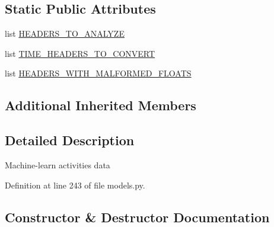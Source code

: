 \subsection*{Static Public Attributes}
\begin{DoxyCompactItemize}
\item 
list \hyperlink{classpygce_1_1analysis_1_1models_1_1_activities_data_analysis_a799ad90125cc686b985fe525a3b33062}{H\+E\+A\+D\+E\+R\+S\+\_\+\+T\+O\+\_\+\+A\+N\+A\+L\+Y\+ZE}
\item 
list \hyperlink{classpygce_1_1analysis_1_1models_1_1_activities_data_analysis_a2f0ccc7899b8c6b6d94391c80f5def1d}{T\+I\+M\+E\+\_\+\+H\+E\+A\+D\+E\+R\+S\+\_\+\+T\+O\+\_\+\+C\+O\+N\+V\+E\+RT}
\item 
list \hyperlink{classpygce_1_1analysis_1_1models_1_1_activities_data_analysis_a272e010f956a64a8f916ebf1b9e14255}{H\+E\+A\+D\+E\+R\+S\+\_\+\+W\+I\+T\+H\+\_\+\+M\+A\+L\+F\+O\+R\+M\+E\+D\+\_\+\+F\+L\+O\+A\+TS}
\end{DoxyCompactItemize}
\subsection*{Additional Inherited Members}


\subsection{Detailed Description}
\begin{DoxyVerb}Machine-learn activities data \end{DoxyVerb}
 

Definition at line 243 of file models.\+py.



\subsection{Constructor \& Destructor Documentation}
